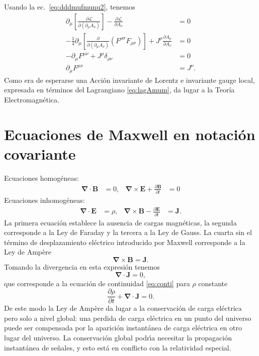 \begin{frame}

Usando la ec.~\eqref{eq:dddmufmunu2}, tenemos
\begin{align}
\label{eq:177qft}
  \partial_\mu\left[
    \frac{\partial\mathcal{L}}{\partial(\partial_\mu A_\nu)}  
  \right]-\frac{\partial\mathcal{L}}{\partial A_\nu}&=0\nonumber\\
  -\frac{1}{4}\partial_\mu\left[
    \frac{\partial}{\partial(\partial_\mu A_\nu)}(F^{\rho\sigma}F_{\rho\sigma})  
  \right]+J^\rho\frac{\partial A_\rho}{\partial A_\nu}&=0\nonumber\\
  -\partial_\mu F^{\mu\nu}+J^\rho\delta_{\rho\nu}&=0\nonumber\\
  \partial_\mu F^{\mu\nu}&=J^\nu.
\end{align}
Como era de esperarse una Acción invariante de Lorentz e invariante
gauge local, expresada en términos del Lagrangiano \eqref{eq:lagAmum},
da lugar a la Teoría Electromagnética. 
\end{frame}



\section{Ecuaciones de Maxwell en notaci\'on covariante }
\label{sec:maxeqs}
Ecuaciones homog\'eneas:
\begin{align}
  \label{eq:hom_m_eq}
  \boldsymbol{\nabla}\cdot\mathbf{B}&=0,&\boldsymbol{\nabla}\times\mathbf{E}+\frac{\partial\mathbf{B}}{\partial t}&=0
\end{align}
Ecuaciones inhomog\'eneas:
\begin{align}
  \label{eq:inhom_m_eq}
  \boldsymbol{\nabla}\cdot\mathbf{E}&=\rho,&\boldsymbol{\nabla}\times\mathbf{B}-\frac{\partial\mathbf{E}}{\partial t}&=\mathbf{J}.
\end{align}
La primera ecuaci\'on establece la ausencia de cargas magn\'eticas, la segunda corresponde a la Ley de Faraday y la tercera a la Ley de Gauss. La cuarta sin el t\'ermino de desplazamiento el\'ectrico introducido por Maxwell corresponde a la Ley de Amp\`ere
\begin{equation}
   \boldsymbol{\nabla}\times\mathbf{B}=\mathbf{J}.
\end{equation}
Tomando la divergencia en esta expresi\'on tenemos
\begin{equation}
  \boldsymbol{\nabla}\cdot\mathbf{J}=0,
\end{equation}
que corresponde a la ecuaci\'on de continuidad \eqref{eq:conti} para $\rho$ constante
\begin{equation}
  \label{eq:153}
  \frac{\partial \rho}{\partial t}+\boldsymbol{\nabla}\cdot\mathbf{J}=0.
\end{equation}
De este modo la Ley de Amp\`ere da lugar a la conservaci\'on de carga el\'ectrica pero solo a nivel global:  una perdida de carga el\'ectrica en un punto del universo puede ser compensada por la aparici\'on instant\'anea de carga el\'ectrica en otro lugar del universo. La conservaci\'on global podr\'\i a necesitar la propagaci\'on instant\'anea de se\~nales, y esto est\'a en conflicto con la relatividad especial.



